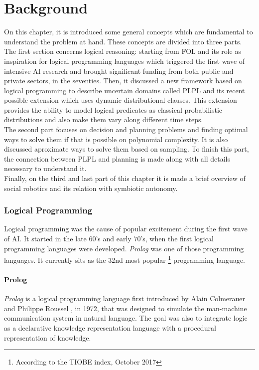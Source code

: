 \newtheorem{definition}{Definition}
\newtheorem{property}{Property}

\chapter{Background}
\label{chapter:background}

On this chapter, it is introduced some general concepts which are fundamental to
understand the problem at hand. These concepts are divided into three parts.
The first section concerns logical reasoning: starting from
\gls{FOL} and its role as inspiration for logical programming languages which
triggered the first wave of intensive \gls{AI} research and brought significant funding from both
public and private sectors, in the seventies. Then, it discussed a new framework
based on logical programming to describe uncertain domains called \gls{PLPL} and
its recent possible extension which uses dynamic distributional clauses. This
extension provides the ability to model
logical predicates as classical probabilistic distributions and also make them
vary along different time steps.\\
The second part focuses on decision and planning problems and finding optimal
ways to solve them if that is possible on polynomial complexity. It is also
discussed aproximate ways to solve them based on sampling. To finish this part,
the connection between \gls{PLPL} and planning is made along with all details
necessary to understand it.\\
Finally, on the third and last part of this chapter it is made a brief overview
of social robotics and its relation with symbiotic autonomy.

\subsection{Logical Programming}

Logical programming was the cause of popular excitement during the first wave of
\gls{AI}. It started in the late 60's and early 70's, when the first logical
programming languages were developed. \textit{Prolog} was one of those programming
languages. It currently sits as the 32nd most popular \footnote{According to the
 TIOBE index, October 2017} programming language.

\subsubsection{Prolog}
\textit{Prolog} is a logical programming language first introduced by Alain Colmerauer
and Philippe Roussel \cite{Colmerauer1993}, in 1972, that was designed to simulate
the man-machine communication system in natural language. The goal was also to
integrate logic as a declarative knowledge representation language with a
procedural representation of knowledge.

